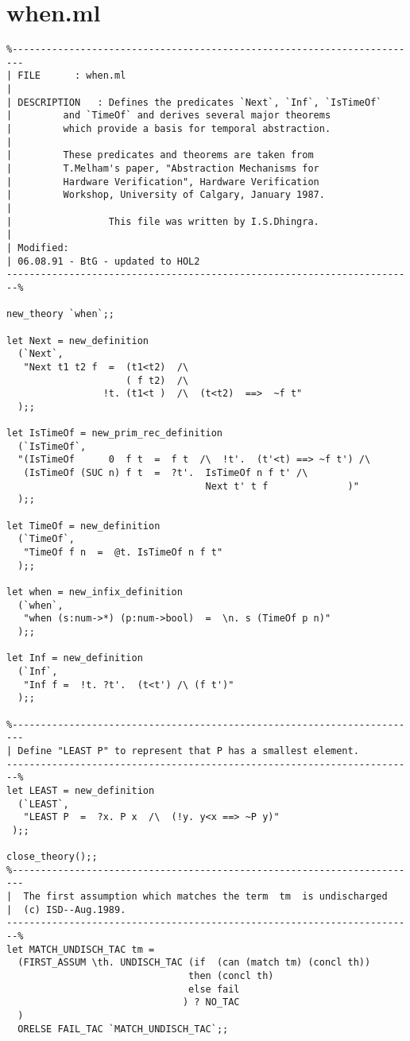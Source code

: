 \section{when.ml}\label{AppendixC}
\begin{verbatim}
%------------------------------------------------------------------------
| FILE		: when.ml
| 
| DESCRIPTION	: Defines the predicates `Next`, `Inf`, `IsTimeOf`
|		  and `TimeOf` and derives several major theorems
|		  which provide a basis for temporal abstraction.
|
|		  These predicates and theorems are taken from
|		  T.Melham's paper, "Abstraction Mechanisms for
|		  Hardware Verification", Hardware Verification
|		  Workshop, University of Calgary, January 1987.
|
|                 This file was written by I.S.Dhingra.
|
| Modified:
| 06.08.91 - BtG - updated to HOL2                                
------------------------------------------------------------------------%

new_theory `when`;;

let Next = new_definition
  (`Next`, 
   "Next t1 t2 f  =  (t1<t2)  /\
                     ( f t2)  /\
                 !t. (t1<t )  /\  (t<t2)  ==>  ~f t"
  );;

let IsTimeOf = new_prim_rec_definition
  (`IsTimeOf`,
  "(IsTimeOf      0  f t  =  f t  /\  !t'.  (t'<t) ==> ~f t') /\
   (IsTimeOf (SUC n) f t  =  ?t'.  IsTimeOf n f t' /\
                                   Next t' t f              )"
  );;

let TimeOf = new_definition
  (`TimeOf`,
   "TimeOf f n  =  @t. IsTimeOf n f t"
  );;

let when = new_infix_definition
  (`when`,
   "when (s:num->*) (p:num->bool)  =  \n. s (TimeOf p n)"
  );;

let Inf = new_definition
  (`Inf`,
   "Inf f =  !t. ?t'.  (t<t') /\ (f t')"
  );;

%------------------------------------------------------------------------
| Define "LEAST P" to represent that P has a smallest element.
------------------------------------------------------------------------%
let LEAST = new_definition
  (`LEAST`,
   "LEAST P  =  ?x. P x  /\  (!y. y<x ==> ~P y)"
 );;

close_theory();;
%------------------------------------------------------------------------
|  The first assumption which matches the term  tm  is undischarged
|  (c) ISD--Aug.1989.
------------------------------------------------------------------------%
let MATCH_UNDISCH_TAC tm =
  (FIRST_ASSUM \th. UNDISCH_TAC (if  (can (match tm) (concl th))
                                then (concl th)
                                else fail
                               ) ? NO_TAC
  )
  ORELSE FAIL_TAC `MATCH_UNDISCH_TAC`;;


\end{verbatim}
